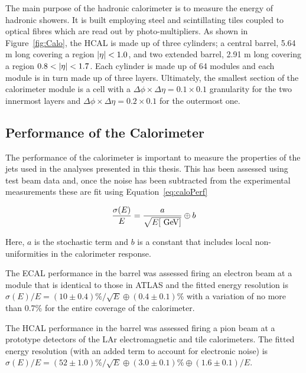 				The main purpose of the hadronic calorimeter is to measure the energy of hadronic showers. It is built employing steel and scintillating tiles coupled to optical fibres which are read out by photo-multipliers. As shown in Figure~\ref{fig:Calo}, the \ac{HCAL} is made up of three cylinders; a central barrel, 5.64 m long covering a region $|\eta| < 1.0$, and two extended barrel, 2.91 m long covering a region $0.8 < |\eta| < 1.7$. Each cylinder is made up of 64 modules and each module is in turn made up of three layers. Ultimately, the smallest section of the calorimeter module is a cell with a $\Delta \phi \times \Delta \eta = 0.1 \times 0.1$ granularity for the two innermost layers and $\Delta \phi \times \Delta \eta = 0.2 \times 0.1$ for the outermost one. 

			\subsection*{Performance of the Calorimeter}

				The performance of the calorimeter is important to measure the properties of the jets used in the analyses presented in this thesis. This has been assessed using test beam data and, once the noise has been subtracted from the experimental measurements these are fit using Equation~\ref{eq:caloPerf}

				\begin{equation}
				\label{eq:caloPerf}
					\frac{\sigma(E)}{E} = \frac{a}{\sqrt{E [ \GeV ] }} \oplus b
				\end{equation}

				\noindent Here, $a$ is the stochastic term and $b$ is a constant that includes local non-uniformities in the calorimeter response. 

				The \ac{ECAL} performance in the barrel was assessed firing an electron beam at a module that is identical to those in \ac{ATLAS} and the fitted energy resolution is $\sigma(E)/E = (10 \pm 0.4)\% / \sqrt{E} \oplus (0.4 \pm 0.1)\%$ with a variation of no more than 0.7\% for the entire coverage of the calorimeter.

				The \ac{HCAL} performance in the barrel was assessed firing a pion beam at a prototype detectors of the \ac{LAr} electromagnetic and tile calorimeters. The fitted energy resolution (with an added term to account for electronic noise) is $\sigma(E) / E = (52 \pm 1.0)\% / \sqrt{E} \oplus (3.0 \pm 0.1)\% \oplus (1.6 \pm 0.1) / E$. 


